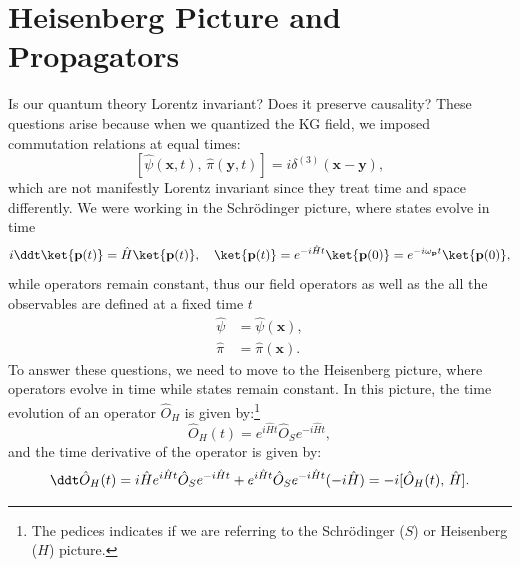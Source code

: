 \section{Heisenberg Picture and Propagators} \label{sec:KG_Heisenberg_picture}

Is our quantum theory Lorentz invariant? Does it preserve causality?
These questions arise because when we quantized the KG field, we imposed commutation relations at equal times:
\[
    [\hat{\psi}(\mathbf{x}, t),\, \hat{\pi}(\mathbf{y}, t)] = i \delta^{(3)}(\mathbf{x}-\mathbf{y}),
\]
which are not manifestly Lorentz invariant since they treat time and space differently. We were working in the Schrödinger picture, where states evolve in time
\[
    i \ddt \ket{\mathbf{p}(t)} = \hat{H} \ket{\mathbf{p}(t)}, \quad \ket{\mathbf{p}(t)} = e^{-i \hat{H} t} \ket{\mathbf{p}(0)} = e^{-i \omega_{\mathbf{p}} t} \ket{\mathbf{p}(0)},
\]
while operators remain constant, thus our field operators as well as the all the observables are defined at a fixed time \(t\)
\[
    \begin{aligned}
        \hat{\psi} & = \hat{\psi}(\mathbf{x}), \\
        \hat{\pi}  & = \hat{\pi}(\mathbf{x}).
    \end{aligned}
\]
To answer these questions, we need to move to the Heisenberg picture, where operators evolve in time while states remain constant. In this picture, the time evolution of an operator \(\hat{O}_H\) is given by:\footnote{The pedices indicates if we are referring to the Schrödinger (\(S\)) or Heisenberg (\(H\)) picture.}
\[
    \hat{O}_H(t) = e^{i \hat{H} t} \hat{O}_S e^{-i \hat{H} t},
\]
and the time derivative of the operator is given by:
\[
    \ddt \hat{O}_H(t) = i \hat{H} e^{i \hat{H} t} \hat{O}_S e^{-i \hat{H} t} + e^{i \hat{H} t} \hat{O}_S e^{-i \hat{H} t} (-i \hat{H}) = -i [\hat{O}_H(t),\, \hat{H}].
\]

